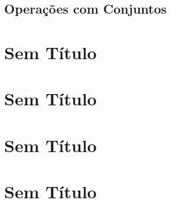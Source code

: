 \documentclass[]{book}
\begin{document}
\section{Operações com Conjuntos}\label{operacoes-com-conjuntos}

\chapter{Sem Título}\label{sem-titulo}

\chapter{Sem Título}\label{sem-titulo-1}

\chapter{Sem Título}\label{sem-titulo-2}

\chapter{Sem Título}\label{sem-titulo-3}


\end{document}

